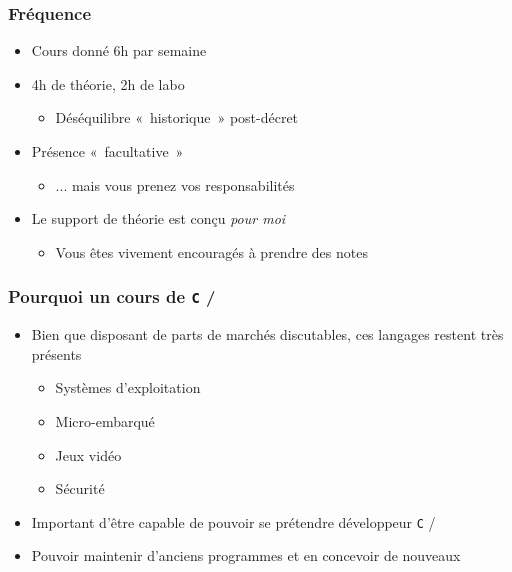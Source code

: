 \begin{frame}
\frametitle{Fréquence}
\begin{itemize}[<+->]
\item Cours donné $6$h par semaine
\item 4h de théorie, 2h de labo
	\begin{itemize}
	\item Déséquilibre «~historique~» post-décret
	\end{itemize}
\item Présence «~facultative~»
	\begin{itemize}
	\item ... mais vous prenez vos responsabilités
	\end{itemize}
\item Le support de théorie est conçu \emph{pour moi}
	\begin{itemize}
	\item Vous êtes vivement encouragés à prendre des notes
	\end{itemize}
\end{itemize}
\end{frame}

\begin{frame}
\frametitle{Pourquoi un cours de \texttt{C} / \cpp}
\begin{itemize}[<+->]
\item Bien que disposant de parts de marchés discutables, ces langages restent très présents
	\begin{itemize}
	\item Systèmes d'exploitation
	\item Micro-embarqué
	\item Jeux vidéo
	\item Sécurité
	\end{itemize}
\item Important d'être capable de pouvoir se prétendre développeur \texttt{C} / \cpp
\item Pouvoir maintenir d'anciens programmes et en concevoir de nouveaux
\end{itemize}
\end{frame}

